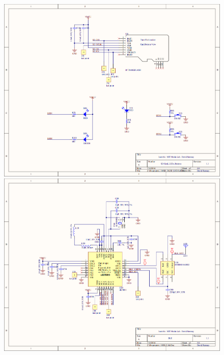 \begin{figure}[htb]
 	\includegraphics[width=\textwidth + \marginparwidth]{schematics/la_schematic4} 
 	\includegraphics[width=\textwidth + \marginparwidth]{schematics/la_schematic5}              
\end{figure}

